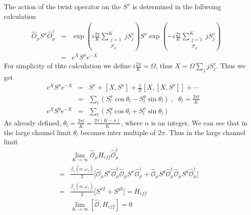 \documentclass[reprint,prb,superscriptaddress]{revtex4-2}
\begin{document}
The action of the twist operator on the $S^x$ is determined in the follwoing calculation
\begin{eqnarray}
\hat{O}_{\mu} S^x \hat{O}^{\dagger}_{\mu} &=& \exp({i\frac{2\pi}{K} \displaystyle\sum_{\substack{j=1\\ \mathcal{P}_{\mu}}}^{K} j S_j^z} )S^x \exp({-i\frac{2\pi}{K} \displaystyle\sum_{\substack{j=1\\ \mathcal{P}_{\mu}}}^{K} j S_j^z} ) \nonumber\\
&=& e^{X} S^x e^{-X}
\end{eqnarray}
For simplicity of thte calculation we define $i\frac{2\pi}{K}=\Omega$, thus $X=\Omega\sum_j jS^z_j$. Thus we get
\begin{eqnarray}
e^X S^x e^{-X}&=& S^x+[X,S^x] + \frac{1}{2!}[X,[X,S^x]] +\cdots  \nonumber\\
&=& \sum_l ( S^x_l \cos \theta_l -  S_l^y \sin \theta_l ) ~,~~~\theta_l=\frac{2\pi l}{K}~~~~\\
e^X S^y e^{-X}&=& \sum_l  (S^y_l \cos\theta_l  + S^x_l \sin\theta_l)
\end{eqnarray}
As already defined, $\theta_l=\frac{2\pi l}{K}=\frac{2\pi (K-n)}{K}$, where $n$ is an integer. We can see that in the large channel limit $\theta_l $ becomes inter multiple of $2\pi$. Thus in the large channel limit
\begin{eqnarray}
&& \lim_{K\rightarrow \infty}\hat{\mathcal{O}}_{\mu} H_{eff} \hat{\mathcal{O}}_{\mu}^{\dagger}\nonumber\\
 &=& \frac{\beta_{\uparrow}(\alpha,\omega_{\uparrow})}{2} \bigg[ \hat{\mathcal{O}}_{\mu} S^x \hat{\mathcal{O}}_{\mu}^{\dagger} \hat{\mathcal{O}}_{\mu} S^x \hat{\mathcal{O}}_{\mu}^{\dagger}  + \hat{\mathcal{O}}_{\mu} S^y \hat{\mathcal{O}}_{\mu}^{\dagger} \hat{\mathcal{O}}_{\mu} S^y \hat{\mathcal{O}}_{\mu}^{\dagger}  \bigg]\nonumber\\
&=&\frac{\beta_{\uparrow}(\alpha,\omega_{\uparrow})}{2} \bigg[  S^{x2}+S^{y2}  \bigg] = H_{eff} \nonumber\\
&&\lim_{K\rightarrow \infty } [\hat{\mathcal{O}},H_{eff}] = 0
\label{eq:hamiltonian_twisted}
\end{eqnarray}
 
\end{document}

